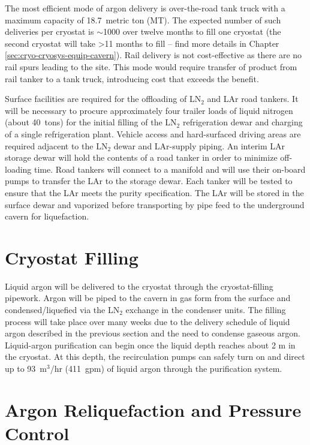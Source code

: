 The most efficient mode of argon delivery is 
over-the-road tank truck with a maximum capacity of 18.7~metric ton (MT).  
The expected number of such deliveries per cryostat is $\sim$1000 
over twelve months to fill one cryostat (the second cryostat will 
take >11 months to fill -- find more details in 
Chapter \ref{sec:cryo-cryosys-equip-cavern}). 
Rail delivery is not cost-effective as there are no rail spurs leading
to the site. This mode would require transfer of product from rail 
tanker to a tank truck, introducing cost that exceeds the benefit.

Surface facilities are required for the offloading of LN$_{2}$ and LAr road tankers. It will be necessary to  procure approximately four trailer loads of liquid nitrogen (about 40~tons) for the initial filling of the LN$_{2}$ refrigeration dewar and charging of a single refrigeration plant. Vehicle access and hard-surfaced driving areas are required adjacent to the LN$_{2}$ dewar and LAr-supply piping. An interim LAr storage dewar will hold the contents of a road tanker in order to minimize off-loading time.  Road tankers will connect to a manifold and will use their on-board pumps to transfer the LAr to the storage 
dewar. Each tanker will be tested to ensure that the LAr meets the purity specification. The LAr will be 
stored in the surface dewar and vaporized before transporting by pipe feed to the
underground cavern for liquefaction.

\section{Cryostat Filling}

Liquid argon will be delivered to the cryostat through the cryostat-filling pipework. Argon will
be piped to the cavern in gas form from the surface
and condensed/liquefied via the LN$_{2}$ exchange in the condenser units.
The filling process will take place over many weeks due to the delivery schedule of liquid
argon described in the previous section and the need to condense gaseous argon.
Liquid-argon purification can begin once the liquid
depth reaches about 2 m in the cryostat. At this depth, the recirculation pumps can safely
turn on and direct up to 93~m$^{3}$/hr (411~gpm) of liquid argon through the purification system.

\section{Argon Reliquefaction and Pressure Control}
\label{subsec:reliquef}

